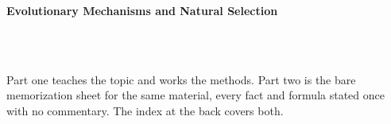 



\makeindex[title={Index of This Volume},columns=2,intoc]

\begin{titlepage}\thispagestyle{empty}
\vspace*{0.14\textheight}
\noindent{\color{tiercore}\rule{\textwidth}{5pt}}\\[3pt]
\noindent{\color{bioline}\rule{\textwidth}{1pt}}\\[26pt]
\\[12pt]
\noindent\begin{minipage}{\textwidth}\raggedright
{\sffamily\bfseries\fontsize{28}{32}\selectfont\color{bioink}%
 \hyphenchar{} Evolutionary Mechanisms and Natural Selection\par}\end{minipage}\\[16pt]
\noindent{\color{biogreen}\rule{\textwidth}{1.4pt}}\\[10pt]
\noindent\begin{minipage}{\textwidth}\raggedright
{\fontsize{10.5}{14}\selectfont\color{biogreen}%
Part one teaches the topic and works the methods. Part two is the bare memorization sheet for the
same material, every fact and formula stated once with no commentary. The index at the back covers both.\par}\end{minipage}
\vfill
\noindent{\color{bioline}\rule{\textwidth}{1pt}}\\[3pt]
\noindent{\color{tiercore}\rule{\textwidth}{5pt}}
\end{titlepage}
\tableofcontents
\clearpage
{}
\clearpage
\printindex

